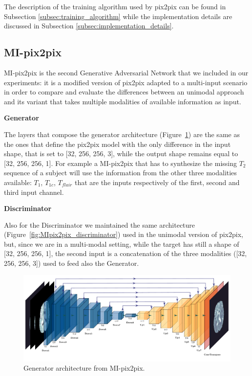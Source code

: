 \noindent The description of the training algorithm used by pix2pix can be found in Subsection \ref{subsec:training_algorithm} while the implementation details are discussed in Subsection \ref{subsec:implementation_details}.

\subsection{MI-pix2pix}
\label{subsec:mi_pix2pix_architecture}
MI-pix2pix is the second Generative Adversarial Network that we included in our experiments: it is a modified version of pix2pix \cite{pix2pix} adapted to a multi-input scenario in order to compare and evaluate the differences between an unimodal approach and its variant that takes multiple modalities of available information as input.

\vspace{6mm} 
\noindent\textbf{Generator}

\vspace{2mm}
\noindent The layers that compose the generator architecture (Figure~\ref{fig:MIpix2pix_generator}) are the same as the ones that define the pix2pix model with the only difference in the input shape, that is set to [32, 256, 256, 3], while the output shape remains equal to [32, 256, 256, 1]. For example a MI-pix2pix that has to synthesize the missing $T_{2}$ sequence of a subject will use the information from the other three modalities available: $T_{1}$, $T_{1c}$, $T_{flair}$ that are the inputs respectively of the first, second and third input channel.

\vspace{6mm} 
\noindent\textbf{Discriminator}

\vspace{2mm}
\noindent Also for the Discriminator we maintained the same architecture (Figure~\ref{fig:MIpix2pix_discriminator}) used in the unimodal version of pix2pix, but, since we are in a multi-modal setting, while the target has still a shape of [32, 256, 256, 1], the second input is a concatenation of the three modalities ([32, 256, 256, 3]) used to feed also the Generator.

\begin{figure}[H]
\centering
\includegraphics[height=0.263\textheight]{images/MIpix2pix_generator.pdf}
\caption[Generator architecture from MI-pix2pix]{Generator architecture from MI-pix2pix.}
\label{fig:MIpix2pix_generator}
\end{figure}

